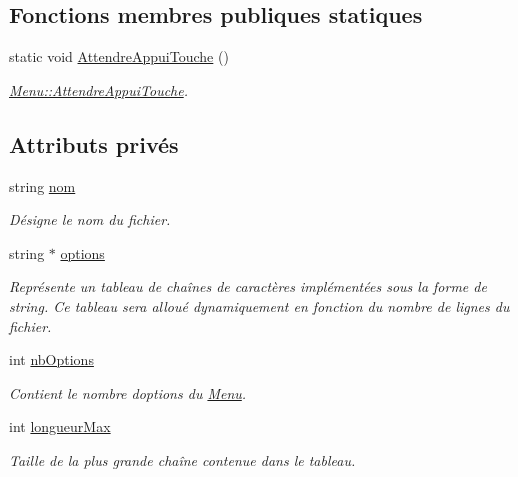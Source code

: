 \subsection*{Fonctions membres publiques statiques}
\begin{DoxyCompactItemize}
\item 
static void \hyperlink{class_menu_a6ddcaabf2fedb30f5136f3be655d60ce}{Attendre\+Appui\+Touche} ()
\begin{DoxyCompactList}\small\item\em \hyperlink{class_menu_a6ddcaabf2fedb30f5136f3be655d60ce}{Menu\+::\+Attendre\+Appui\+Touche}. \end{DoxyCompactList}\end{DoxyCompactItemize}
\subsection*{Attributs privés}
\begin{DoxyCompactItemize}
\item 
string \hyperlink{class_menu_a99574cb51606811f697854859bc1ccc1}{nom}
\begin{DoxyCompactList}\small\item\em Désigne le nom du fichier. \end{DoxyCompactList}\item 
string $\ast$ \hyperlink{class_menu_aec975cfea9216420d5754ce2e9321390}{options}
\begin{DoxyCompactList}\small\item\em Représente un tableau de chaînes de caractères implémentées sous la forme de string. Ce tableau sera alloué dynamiquement en fonction du nombre de lignes du fichier. \end{DoxyCompactList}\item 
int \hyperlink{class_menu_ad59953635d184fefcddf95015a761187}{nb\+Options}
\begin{DoxyCompactList}\small\item\em Contient le nombre d\textquotesingle{}options du \hyperlink{class_menu}{Menu}. \end{DoxyCompactList}\item 
int \hyperlink{class_menu_a745c540589015b573d8214e1080e2a8e}{longueur\+Max}
\begin{DoxyCompactList}\small\item\em Taille de la plus grande chaîne contenue dans le tableau. \end{DoxyCompactList}\end{DoxyCompactItemize}


